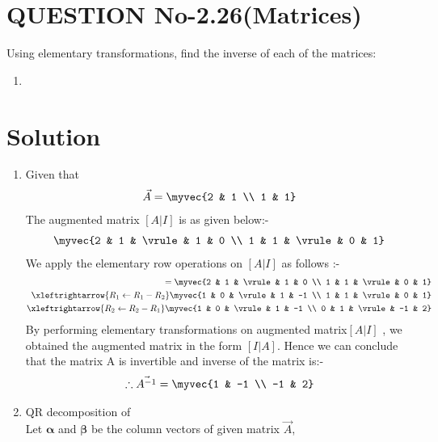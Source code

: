 \documentclass[journal,12pt,twocolumn]{IEEEtran}
\begin{document}
\section{QUESTION No-2.26(Matrices)}
Using elementary transformations, find the inverse of each of the matrices:
\begin{enumerate}
\item {}
\end{enumerate}
\section{Solution}
\begin{enumerate}
\item Given that
\begin{align}
\vec{A} = \myvec{2 & 1 \\ 1 & 1}
\end{align}
The augmented matrix $ [A | I]$ is as given below:- 
\begin{align}
\myvec{2 & 1 & \vrule & 1 & 0 \\ 1 & 1 & \vrule & 0 & 1}
\end{align}
We apply the elementary row operations on $ [A | I]$ as follows :-
\begin{align}
[A | I] = \myvec{2 & 1 & \vrule & 1 & 0 \\ 1 & 1 & \vrule & 0 & 1}
\\
\xleftrightarrow{R_1\leftarrow R_1-R_2}   
\myvec{1 & 0 & \vrule & 1 & -1 \\ 1 & 1 & \vrule & 0 & 1}
\\
\xleftrightarrow{R_2\leftarrow R_2-R_1}
\myvec{1 & 0 & \vrule & 1 & -1 \\ 0 & 1 & \vrule & -1 & 2}
\end{align}
By performing elementary transformations on augmented matrix$ [A | I]$ , we obtained the augmented matrix in the form $ [I | A]$. 
Hence we can conclude that the matrix A is invertible and inverse of the matrix is:-
\begin{align}
\therefore\vec{A^{-1}}=\myvec {1 & -1 \\  -1 & 2} 
\end{align}
\item QR decomposition of  
\\
Let $\boldsymbol{\alpha}$ and $\boldsymbol{\beta}$ be the column vectors of given matrix $\vec{A}$,
\begin{align}

\end{align}
\end{enumerate}
\end{document}

